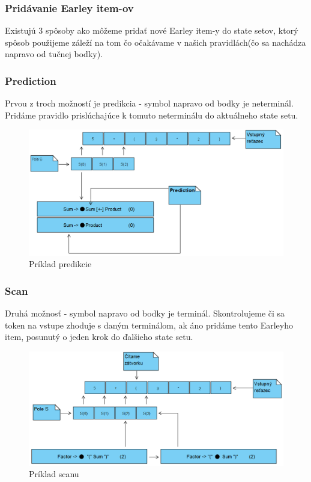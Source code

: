 \documentclass[12pt,a4paper]{report}
\theoremstyle{definition}
\theoremstyle{remark}
\begin{document}
\subsubsection*{Pridávanie Earley item-ov}
Existujú 3 spôsoby ako môžeme pridať nové Earley item-y do state setov, ktorý spôsob použijeme záleží na tom čo očakávame v našich pravidlách(čo sa nachádza napravo od tučnej bodky).

\subsubsection*{Prediction}
Prvou z troch možností je predikcia - symbol napravo od bodky je neterminál. Pridáme pravidlo prislúchajúce k tomuto neterminálu do aktuálneho state setu.

\begin{figure}[h]
\centering
\includegraphics[scale=0.7]{prediction}
\caption{Príklad predikcie}
\end{figure}
\subsubsection*{Scan}
Druhá možnosť - symbol napravo od bodky je terminál. Skontrolujeme či sa token na vstupe zhoduje s daným terminálom, ak áno pridáme tento Earleyho item, posunutý o jeden krok do ďalšieho state setu.

\begin{figure}[h]
\centering
\includegraphics[scale=0.7]{scan}
\caption{Príklad scanu}
\end{figure}
\end{document}
